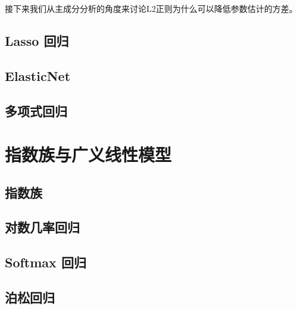 接下来我们从主成分分析的角度来讨论L2正则为什么可以降低参数估计的方差。








\subsection{Lasso 回归} %
\label{sub:lasso_回归}




\subsection{ElasticNet} %
\label{sub:elasticnet}


\subsection{多项式回归} %
\label{sub:多项式回归}



\section{指数族与广义线性模型} %
\label{sec:指数族与广义线性模型}
\subsection{指数族} %
\label{sub:指数族}

\subsection{对数几率回归} %
\label{sub:对数几率回归}


\subsection{Softmax 回归} %
\label{sub:softmax_回归}


\subsection{泊松回归} %
\label{sub:泊松回归}


